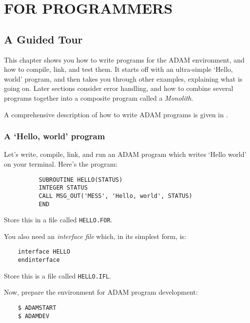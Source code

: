 \part{FOR PROGRAMMERS}
\label{P_programmers}
\pagestyle{myheadings}

\chapter{A Guided Tour}
\label{C_simpap}

This chapter shows you how to write programs for the ADAM environment, and
how to compile, link, and test them.
It starts off with an ultra-simple `Hello, world' program, and then takes you
through other examples, explaining what is going on.
Later sections consider error handling, and how to combine several programs
together into a composite program called a {\em Monolith}.

A comprehensive description of how to write ADAM programs is given in
.

\section{A `Hello, world' program}
\label{S_prog1}

Let's write, compile, link, and run an ADAM program which writes `Hello world'
on your terminal.
Here's the program:

\begin{small}
\begin{verbatim}
          SUBROUTINE HELLO(STATUS)
          INTEGER STATUS
          CALL MSG_OUT('MESS', 'Hello, world', STATUS)
          END
\end{verbatim}
\end{small}

Store this in a file called \verb+HELLO.FOR+.

You also need an {\em interface file} which, in its simplest form, is:

\begin{small}
\begin{verbatim}
    interface HELLO
    endinterface
\end{verbatim}
\end{small}

Store this is a file called \verb+HELLO.IFL+.

Now, prepare the environment for ADAM program development:

\begin{small}
\begin{verbatim}
    $ ADAMSTART
    $ ADAMDEV
\end{verbatim}
\end{small}

